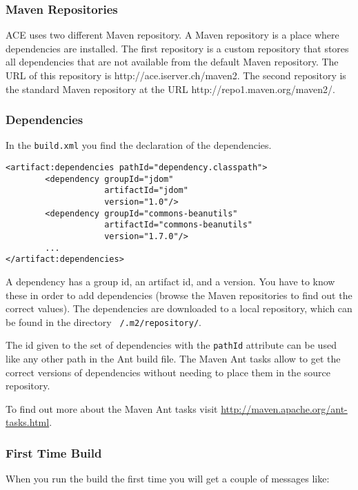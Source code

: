 \documentclass[11pt,a4paper]{article}
\begin{document}
\subsubsection{Maven Repositories}
ACE uses two different Maven repository. A Maven repository is a place where
dependencies are installed. The first repository is a custom repository that
stores all dependencies that are not available from the default Maven
repository. The URL of this repository is http://ace.iserver.ch/maven2. The
second repository is the standard Maven repository at the URL
http://repo1.maven.org/maven2/.

\subsubsection{Dependencies}
In the \texttt{build.xml} you find the declaration of the dependencies.

\small{\begin{verbatim}
<artifact:dependencies pathId="dependency.classpath">
		<dependency groupId="jdom" 
		            artifactId="jdom" 
		            version="1.0"/>
		<dependency groupId="commons-beanutils" 
		            artifactId="commons-beanutils" 
		            version="1.7.0"/>
        ...
</artifact:dependencies>
\end{verbatim}}

A dependency has a group id, an artifact id, and a version. You have to know
these in order to add dependencies (browse the Maven repositories to find
out the correct values). The dependencies are downloaded to a local repository,
which can be found in the directory \texttt{~/.m2/repository/}.

The id given to the set of dependencies with the \texttt{pathId} attribute
can be used like any other path in the Ant build file. The Maven Ant tasks
allow to get the correct versions of dependencies without needing to place
them in the source repository.

To find out more about the Maven Ant tasks visit
\href{http://maven.apache.org/ant-tasks.html}{http://maven.apache.org/ant-tasks.html}.

\subsubsection{First Time Build}
When you run the build the first time you will get a couple of messages like:
\end{document}
